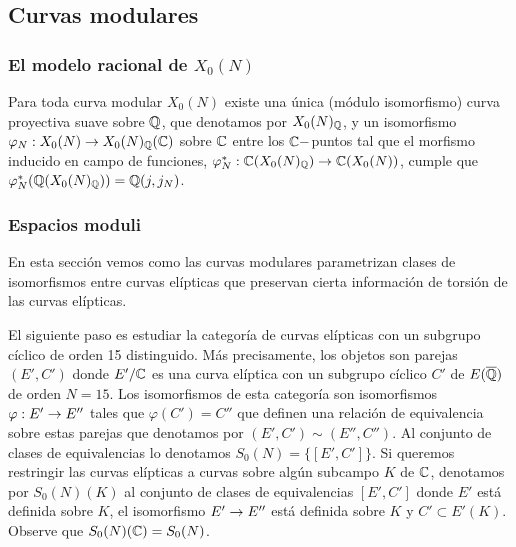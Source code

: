 \subsection{Curvas modulares}

\subsubsection{El modelo racional de $X_0(N)$
}
\begin{thm}\label{thm:modelo-racional}
	Para toda curva modular $X_0(N)$ existe una única (módulo isomorfismo) curva proyectiva suave sobre $\mathbb{Q}$, que denotamos por $X_0(N)_{\mathbb{Q}}$, y un isomorfismo $\varphi_N:X_0(N)\rightarrow X_0(N)_{\mathbb{Q}}(\mathbb{C})$ sobre $\mathbb{C}$ entre los $\mathbb{C}-$puntos tal que el morfismo inducido en campo de funciones, $\varphi_N^*:\mathbb{C}(X_0(N)_{\mathbb{Q}})\rightarrow\mathbb{C}(X_0(N))$, cumple que $\varphi_N^*(\mathbb{Q}(X_0(N)_{\mathbb{Q}}))=\mathbb{Q}(j,j_N)$.
\end{thm}


\subsubsection{Espacios moduli}\label{sec:curvas-modulares}
En esta sección vemos como las curvas modulares parametrizan clases de isomorfismos entre curvas elípticas que preservan cierta información de torsión de las curvas elípticas.

El siguiente paso es estudiar la categoría de curvas elípticas con un subgrupo cíclico de orden 15 distinguido. Más precisamente, los objetos son parejas $(E',C')$ donde $E'/\mathbb{C}$ es una curva elíptica con un subgrupo cíclico $C'$ de $E(\overline{\mathbb{Q}})$ de orden $N=15$. Los isomorfismos de esta categoría son isomorfismos $\varphi:E'\rightarrow E''$ tales que $\varphi(C')= C''$ que definen una relación de equivalencia sobre estas parejas que denotamos por $(E',C')\sim(E'',C'')$. Al conjunto de clases de equivalencias lo denotamos $S_0(N)=\{[E',C']\}$. Si queremos restringir las curvas elípticas a curvas sobre algún subcampo $K$ de $\mathbb{C}$, denotamos por $S_0(N)(K)$ al conjunto de clases de equivalencias $[E',C']$ donde $E'$ está definida sobre $K$, el isomorfismo $E'\rightarrow E''$ está definida sobre $K$ y $C'\subset E'(K)$. Observe que $S_0(N)(\mathbb{C})=S_0(N)$.

